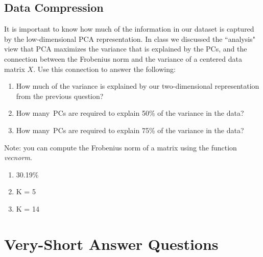 \documentclass{article}
\def\blu#1{{\color{blu}#1}}
\def\enum#1{\begin{enumerate}#1\end{enumerate}}
\begin{document}
\subsection{Data Compression}

It is important to know how much of the information in our dataset is captured by the low-dimensional PCA representation.
In class we discussed the ``analysis" view that PCA maximizes the variance that is explained by the PCs, and the connection between the Frobenius norm and the variance of a centered data matrix $X$. Use this connection to answer the following:
\blu{\enum{
\item How much of the variance is explained by our two-dimensional representation from the previous question?
\item How many\ PCs are required to explain 50\% of the variance in the data?
\item How many\ PCs are required to explain 75\% of the variance in the data?
}}
Note: you can compute the Frobenius norm of a matrix using the function \emph{vecnorm}.

\enum{
\item 30.19\% 
\item K = 5
\item K = 14
}


\section{Very-Short Answer Questions}
\end{document}
